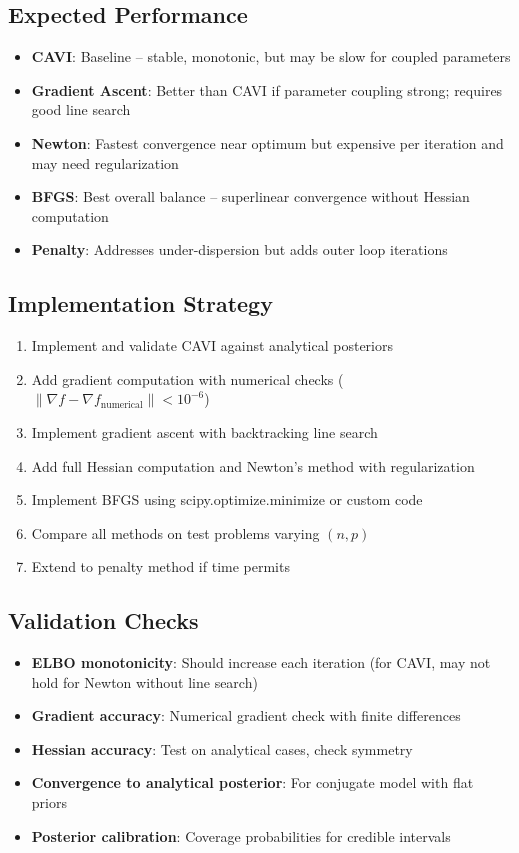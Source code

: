 \documentclass[11pt]{article}
\begin{document}
\subsection{Expected Performance}

\begin{itemize}
\item \textbf{CAVI}: Baseline -- stable, monotonic, but may be slow for coupled parameters
\item \textbf{Gradient Ascent}: Better than CAVI if parameter coupling strong; requires good line search
\item \textbf{Newton}: Fastest convergence near optimum but expensive per iteration and may need regularization
\item \textbf{BFGS}: Best overall balance -- superlinear convergence without Hessian computation
\item \textbf{Penalty}: Addresses under-dispersion but adds outer loop iterations
\end{itemize}

\subsection{Implementation Strategy}

\begin{enumerate}
\item Implement and validate CAVI against analytical posteriors
\item Add gradient computation with numerical checks ($\|\nabla f - \nabla f_{\text{numerical}}\| < 10^{-6}$)
\item Implement gradient ascent with backtracking line search
\item Add full Hessian computation and Newton's method with regularization
\item Implement BFGS using scipy.optimize.minimize or custom code
\item Compare all methods on test problems varying $(n, p)$
\item Extend to penalty method if time permits
\end{enumerate}

\subsection{Validation Checks}

\begin{itemize}
\item \textbf{ELBO monotonicity}: Should increase each iteration (for CAVI, may not hold for Newton without line search)
\item \textbf{Gradient accuracy}: Numerical gradient check with finite differences
\item \textbf{Hessian accuracy}: Test on analytical cases, check symmetry
\item \textbf{Convergence to analytical posterior}: For conjugate model with flat priors
\item \textbf{Posterior calibration}: Coverage probabilities for credible intervals
\end{itemize}
\end{document}
